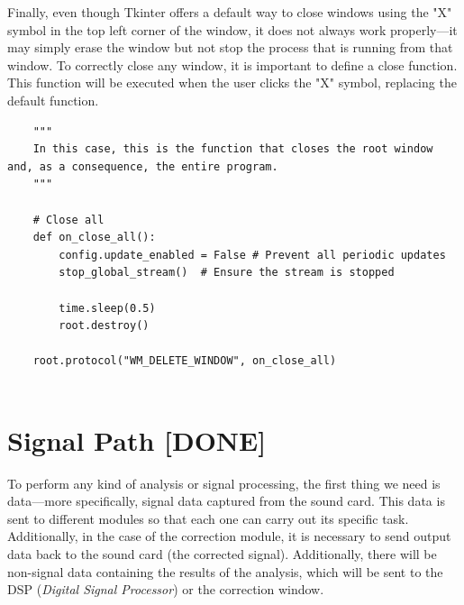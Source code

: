 Finally, even though Tkinter offers a default way to close windows using the "X" symbol in the top left corner of the window, it does not always work properly—it may simply erase the window but not stop the process that is running from that window. To correctly close any window, it is important to define a close function. This function will be executed when the user clicks the "X" symbol, replacing the default function.

\begin{verbatim}
	"""
	In this case, this is the function that closes the root window and, as a consequence, the entire program.
	"""
	
	# Close all
	def on_close_all():
		config.update_enabled = False # Prevent all periodic updates
		stop_global_stream()  # Ensure the stream is stopped
	
		time.sleep(0.5)
		root.destroy()
	
	root.protocol("WM_DELETE_WINDOW", on_close_all)
	
\end{verbatim}



\section{Signal Path [DONE]}

To perform any kind of analysis or signal processing, the first thing we need is data—more specifically, signal data captured from the sound card. This data is sent to different modules so that each one can carry out its specific task. Additionally, in the case of the correction module, it is necessary to send output data back to the sound card (the corrected signal). Additionally, there will be non-signal data containing the results of the analysis, which will be sent to the DSP (\textit{Digital Signal Processor}) or the correction window.

